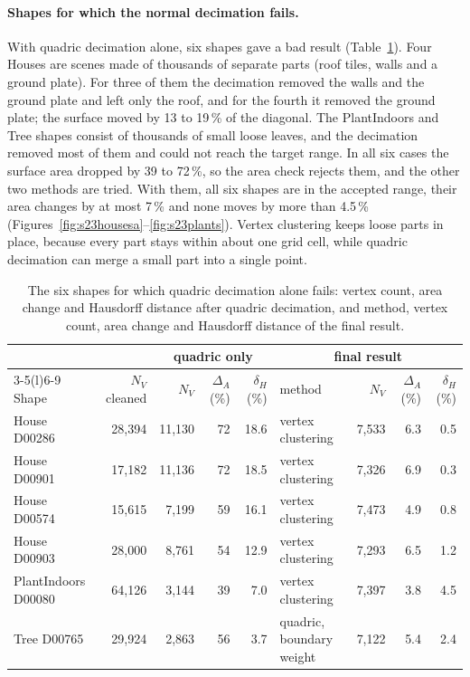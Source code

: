 \documentclass[10pt,a4paper]{article}
\begin{document}
\paragraph{Shapes for which the normal decimation fails.} With quadric decimation alone, six shapes gave a bad result
(Table~\ref{tab:s23exceptions}). Four Houses are scenes made of thousands of separate parts (roof tiles, walls and a ground plate).
For three of them the decimation removed the walls and the ground plate and left only the roof, and for the fourth it removed the
ground plate; the surface moved by 13 to 19\,\% of the diagonal. The PlantIndoors and Tree shapes consist of thousands of small
loose leaves, and the decimation removed most of them and could not reach the target range. In all six cases the surface area
dropped by 39 to 72\,\%, so the area check rejects them, and the other two methods are tried. With them, all six shapes are in
the accepted range, their area changes by at most 7\,\% and none moves by more than 4.5\,\%
(Figures~\ref{fig:s23housesa}--\ref{fig:s23plants}). Vertex clustering keeps loose parts in place, because every part stays
within about one grid cell, while quadric decimation can merge a small part into a single point.

\begin{table}[htbp]\centering\small\setlength{\tabcolsep}{4pt}
\begin{tabular}{@{}lrrrrlrrr@{}}\toprule
 & & \multicolumn{3}{c}{quadric only} & \multicolumn{4}{c}{final result}\\\cmidrule(lr){3-5}\cmidrule(l){6-9}
Shape & $N_V$ cleaned & $N_V$ & $\Delta_A$ (\%) & $\delta_H$ (\%) & method & $N_V$ & $\Delta_A$ (\%) & $\delta_H$ (\%)\\\midrule
House D00286        & 28,394 & 11,130 & 72 & 18.6 & vertex clustering & 7,533 & 6.3 & 0.5\\
House D00901        & 17,182 & 11,136 & 72 & 18.5 & vertex clustering & 7,326 & 6.9 & 0.3\\
House D00574        & 15,615 & 7,199  & 59 & 16.1 & vertex clustering & 7,473 & 4.9 & 0.8\\
House D00903        & 28,000 & 8,761  & 54 & 12.9 & vertex clustering & 7,293 & 6.5 & 1.2\\
PlantIndoors D00080 & 64,126 & 3,144  & 39 & 7.0  & vertex clustering & 7,397 & 3.8 & 4.5\\
Tree D00765         & 29,924 & 2,863  & 56 & 3.7  & quadric, boundary weight & 7,122 & 5.4 & 2.4\\
\bottomrule\end{tabular}
\caption{The six shapes for which quadric decimation alone fails: vertex count, area change and Hausdorff distance after quadric
decimation, and method, vertex count, area change and Hausdorff distance of the final result.}\label{tab:s23exceptions}
\end{table}
\end{document}
